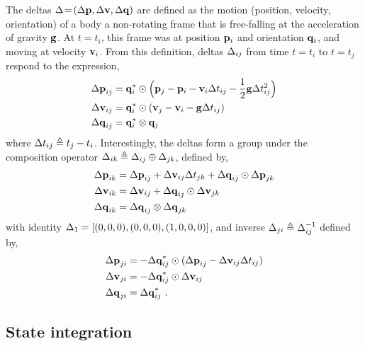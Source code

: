 The deltas $\Delta\!=\!({\Delta{\bf p}},{\Delta{\bf v}},{\Delta{\bf q}})$ are defined as the motion (position, velocity, orientation) of a body \wrt a non-rotating frame that is free-falling at the acceleration of gravity ${\bf g}$. At $t=t_i$, this frame was at position ${\bf p}_i$ and orientation ${\bf q}_i$, and moving at velocity ${\bf v}_i$. From this definition, deltas $\Delta_{ij}$ from time $t=t_i$ to $t=t_j$ respond to the expression,
%
\begin{align}
\begin{split}
{\Delta{\bf p}}_{ij} &= {\bf q}_i^*\odot\Big({\bf p}_j - {\bf p}_i - {\bf v}_i\Delta t_{ij} - \frac12{\bf g}\Delta t_{ij}^2\Big) \\
{\Delta{\bf v}}_{ij} &= {\bf q}_i^*\odot({\bf v}_j - {\bf v}_i - {\bf g}\Delta t_{ij}) \\
{\Delta{\bf q}}_{ij} &= {\bf q}_i^*\otimes{\bf q}_j 
\end{split}
\end{align}
%
where $\Delta t_{ij} \triangleq t_j - t_i$. Interestingly, the deltas form a group under the composition operator $\Delta_{ik}\triangleq\Delta_{ij}\oplus\Delta_{jk}$, defined by,
%
\begin{align} \label{equ:g_composition}
\begin{split}
{\Delta{\bf p}}_{ik} 
&= {\Delta{\bf p}}_{ij} + {\Delta{\bf v}}_{ij}\Delta t_{jk} + {\Delta{\bf q}}_{ij}\odot{\Delta{\bf p}}_{jk} \\
{\Delta{\bf v}}_{ik} 
&= {\Delta{\bf v}}_{ij} + {\Delta{\bf q}}_{ij}\odot{\Delta{\bf v}}_{jk} \\
{\Delta{\bf q}}_{ik} 
&= {\Delta{\bf q}}_{ij}\otimes{\Delta{\bf q}}_{jk} 
\end{split}
\end{align}
%
with identity $\Delta_1=[(0,0,0),(0,0,0),(1,0,0,0)]$, and inverse $\Delta_{ji}\triangleq\Delta_{ij}^{-1}$ defined by,
%
\begin{align}
\begin{split}
{\Delta{\bf p}}_{ji} 
&= -{\Delta{\bf q}}_{ij}^*\odot({\Delta{\bf p}}_{ij} - {\Delta{\bf v}}_{ij}\Delta t_{ij}) \\
{\Delta{\bf v}}_{ji} 
&= -{\Delta{\bf q}}_{ij}^*\odot{\Delta{\bf v}}_{ij} \\
{\Delta{\bf q}}_{ji} 
&= {\Delta{\bf q}}_{ij}^*
~.
\end{split}
\end{align}


\subsection{State integration}

